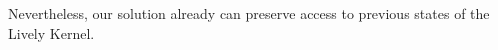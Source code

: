 Nevertheless, our solution already can preserve access to previous states of the Lively Kernel.



% 






